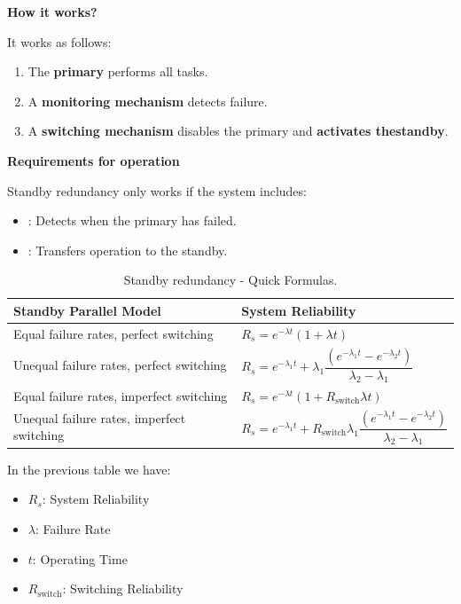 \highspace
\begin{flushleft}
    \textcolor{Green3}{ \textbf{How it works?}}
\end{flushleft}
It works as follows:
\begin{enumerate}
    \item The \textbf{primary} performs all tasks.
    \item A \textbf{monitoring mechanism} detects failure.
    \item A \textbf{switching mechanism} disables the primary and \textbf{activates the\break standby}.
\end{enumerate}

\highspace
\begin{flushleft}
    \textcolor{Green3}{ \textbf{Requirements for operation}}
\end{flushleft}
Standby redundancy only works if the system includes:
\begin{itemize}
    \item {}: Detects when the primary has failed.
    \item {}: Transfers operation to the standby.
\end{itemize}

\newpage

\begin{table}[!htp]
	\centering
    \begin{adjustbox}{width={\textwidth},totalheight={\textheight},keepaspectratio}
        \begin{tabular}{@{} p{18em} | p{17em} @{}}
            \toprule
            \textbf{Standby Parallel Model} & \textbf{System Reliability} \\
            \midrule
            Equal failure rates, perfect switching & $R_{s} = e^{-\lambda t}\left(1 + \lambda t\right)$ \\ [1em]
            Unequal failure rates, perfect switching & $R_{s} = e^{-\lambda_{1} t} + \lambda_{1} \dfrac{\left(e^{-\lambda_{1} t} - e^{-\lambda_{2} t}\right)}{\lambda_{2}-\lambda_{1}}$ \\ [1.5em]
            Equal failure rates, imperfect switching & $R_{s} = e^{-\lambda t} \left(1 + R_{\text{switch}} \lambda t\right)$ \\ [1em]
            Unequal failure rates, imperfect switching & $R_{s} = e^{-\lambda_{1} t} + R_{\text{switch}}\lambda_{1} \dfrac{\left(e^{-\lambda_{1} t} - e^{-\lambda_{2} t}\right)}{\lambda_{2} - \lambda_{1}}$ \\
            \bottomrule
        \end{tabular}
    \end{adjustbox}
	\caption{Standby redundancy - Quick Formulas.}
\end{table}

\noindent
In the previous table we have:
\begin{itemize}
	\item $R_{s}$: System Reliability
	\item $\lambda$: Failure Rate
	\item $t$: Operating Time
	\item $R_{\text{switch}}$: Switching Reliability
\end{itemize}